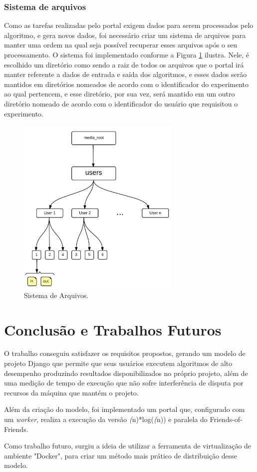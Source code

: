 \documentclass[tg]{mdtufsm}
\begin{document}
\subsection{Sistema de arquivos}

Como as tarefas realizadas pelo portal exigem dados para serem processados pelo algoritmo, e gera novos dados, foi necessário criar um sistema de arquivos para manter uma ordem na qual seja possível recuperar esses arquivos após o seu processamento.
O sistema foi implementado conforme a Figura  \ref{fig:filesystem} ilustra. Nele, é escolhido um diretório como sendo a raiz de todos os arquivos que o portal irá manter referente a dados de entrada e saída dos algoritmos, e esses dados serão mantidos em diretórios nomeados de acordo com o identificador do experimento ao qual pertencem, e esse diretório, por sua vez, será mantido em um outro diretório nomeado de acordo com o identificador do usuário que requisitou o experimento.

\begin{figure}
	\centering
	\includegraphics[width=0.7\textwidth]{filesystem}
	\caption{
		Sistema de Arquivos.
	}
	\label{fig:filesystem}
\end{figure}

\chapter{Conclusão e Trabalhos Futuros}
O trabalho conseguiu satisfazer os requisitos propostos, gerando um modelo de projeto Django que permite que seus usuários executem algoritmos de alto desempenho produzindo resultados disponibilizados no próprio projeto, além de uma medição de tempo de execução que não sofre interferência de disputa por recursos da máquina que mantém o projeto.

Além da criação do modelo, foi implementado um portal que, configurado com um \emph{worker}, realiza a execução da versão \emph(n)*log(\emph(n)) e paralela do Friends-of-Friends.

Como trabalho futuro, surgiu a ideia de utilizar a ferramenta de virtualização de ambiente "Docker", para criar um método mais prático de distribuição desse modelo.

\setlength{\baselineskip}{\baselineskip}


\end{document}
